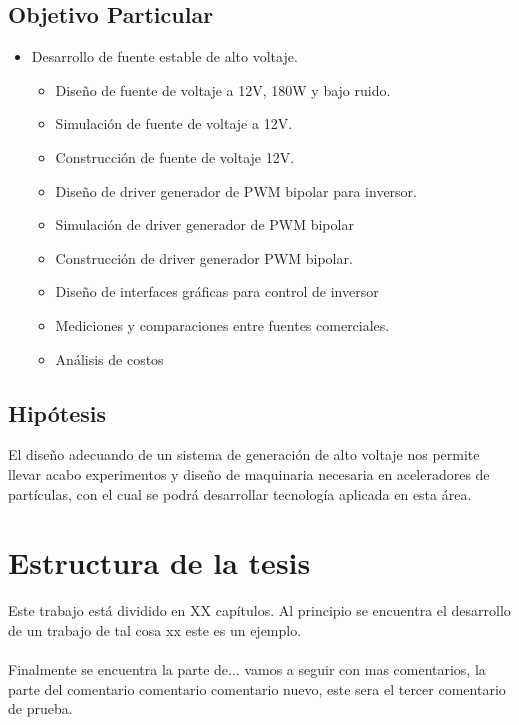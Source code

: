 \subsection{Objetivo Particular}


\begin{itemize}
\item Desarrollo de fuente estable de alto voltaje.
\begin{itemize}
\item Diseño de fuente de voltaje a 12V, 180W y bajo ruido.
\item Simulación de fuente de voltaje a 12V.
\item Construcción de fuente de voltaje 12V.
\item Diseño de driver generador de PWM bipolar para inversor.
\item Simulación de driver generador de PWM bipolar
\item Construcción de driver generador PWM bipolar.
\item Diseño de interfaces gráficas para control de inversor
\item Mediciones y comparaciones entre fuentes comerciales.
\item Análisis de costos
\end{itemize}  
\end{itemize}

\subsection{Hipótesis}
El diseño adecuando de un sistema de generación de alto voltaje nos permite llevar acabo experimentos y diseño de maquinaria necesaria en aceleradores de partículas, con el cual se podrá desarrollar tecnología aplicada en esta área.


\section{Estructura de la tesis}

Este trabajo está dividido en XX capítulos. Al principio se encuentra el desarrollo de un trabajo de tal cosa xx este es un ejemplo.
\\\\
Finalmente se encuentra la parte de... vamos a seguir con mas comentarios, la parte del comentario comentario comentario nuevo, este sera el tercer comentario de prueba.